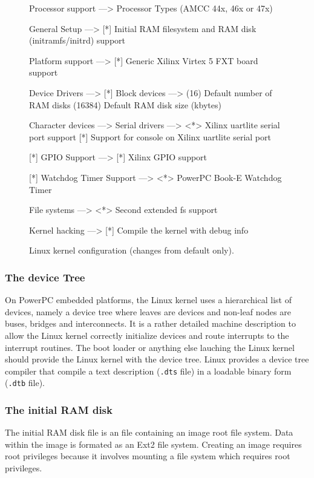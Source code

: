 \begin{figure}[!ht]
\begin{center}
\begin{script}
Processor support  --->
        Processor Types (AMCC 44x, 46x or 47x)

General Setup  --->
    [*] Initial RAM filesystem and RAM disk (initramfs/initrd) support

Platform support  --->
    [*] Generic Xilinx Virtex 5 FXT board support

Device Drivers  --->
    [*] Block devices  --->
        (16)    Default number of RAM disks
         (16384) Default RAM disk size (kbytes)

        Character devices  --->
            Serial drivers  --->
                <*> Xilinx uartlite serial port support
                [*]   Support for console on Xilinx uartlite serial port

    [*] GPIO Support  --->
        [*] Xilinx GPIO support

    [*] Watchdog Timer Support  --->
        <*> PowerPC Book-E Watchdog Timer

File systems  --->
    <*> Second extended fs support

Kernel hacking  --->
    [*] Compile the kernel with debug info
\end{script}
\end{center}
\caption{Linux kernel configuration (changes from default only).}
\label{fig:kernel_configuration}
\end{figure}



\subsubsection{The device Tree}

On PowerPC embedded platforms, the Linux kernel uses a hierarchical list of devices, namely a device tree where leaves are devices and non-leaf nodes are buses, bridges and interconnects.
It is a rather detailed machine description to allow the Linux kernel correctly initialize devices and route interrupts to the interrupt routines.
The boot loader or anything else lauching the Linux kernel should provide the Linux kernel with the device tree.
Linux provides a device tree compiler that compile a text description (\texttt{.dts} file) in a loadable binary form (\texttt{.dtb} file).

\subsubsection{The initial RAM disk}
The initial RAM disk file is an file containing an image root file system. Data within the image is formated as an Ext2 file system.
Creating an image requires root privileges because it involves mounting a file system which requires root privileges.

